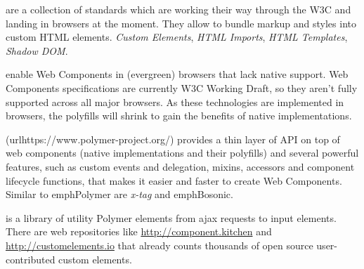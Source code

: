 \begin{description}
\itemsep1pt\parskip0pt

\item[Web Components] are a collection of standards which are working
their way through the W3C and landing in browsers at the moment. They allow to
bundle markup and styles into custom HTML elements. \emph{Custom
Elements}\cite{custom-elements}, \emph{HTML Imports}\cite{html-imports},
\emph{HTML Templates}\cite{html-templates}, \emph{Shadow DOM}\cite{shadow-
dom}.

\item[webcomponent.js polyfills] enable Web Components in (evergreen)
browsers that lack native support. Web Components specifications are currently
W3C Working Draft, so they aren’t fully supported across all major browsers.
As these technologies are implemented in browsers, the polyfills will shrink
to gain the benefits of native implementations. \cite{webcomponents-polyfills}

\item[Polymer library] (url{https://www.polymer-project.org/}) provides a thin
layer of API on top of web components (native implementations and their
polyfills) and several powerful features, such as custom events and
delegation, mixins, accessors and component lifecycle functions, that makes
it easier and faster to create Web Components. Similar to emph{Polymer} are
\emph{x-tag} and emph{Bosonic}.

\item[iron-elements] \cite{iron-elements} is a library of utility Polymer elements from ajax requests to input elements. 
There are web repositories like \url{http://component.kitchen} and \url{http://customelements.io} that already counts thousands of open source user-contributed custom elements.

\end{description}


 

